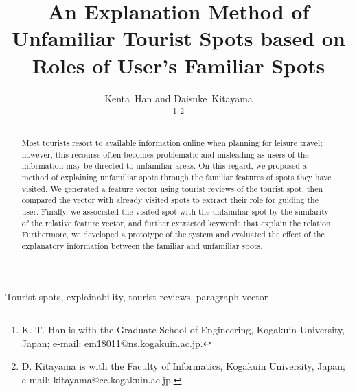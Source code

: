 \documentclass[journal]{IAENGtran}
\begin{document}
\title{An Explanation Method of Unfamiliar Tourist Spots based on Roles of User's Familiar Spots}
\author{Kenta~Han and Daisuke~Kitayama

\thanks{K. T. Han is with the Graduate School of Engineering, Kogakuin University, Japan; e-mail: em18011@ns.kogakuin.ac.jp.}%
\thanks{D. Kitayama is with the Faculty of Informatics, Kogakuin University, Japan;  e-mail: kitayama@cc.kogakuin.ac.jp.}}%

\maketitle

\pagestyle{empty}
\thispagestyle{empty}

\begin{abstract}
Most tourists resort to available information online when planning for leisure travel; however, this recourse often becomes problematic and misleading as users of the information may be directed to unfamiliar areas. On this regard, we proposed a method of explaining unfamiliar spots through the familiar features of spots they have visited. We generated a feature vector using  tourist reviews of the tourist spot, then compared the vector with already visited spots to extract their role for guiding the user. Finally, we associated the visited spot with the unfamiliar spot by the similarity of the relative feature vector, and further extracted keywords that explain the relation. Furthermore, we developed a prototype of the system and evaluated the effect of the explanatory information between the familiar and unfamiliar spots.
\end{abstract}

\begin{IAENGkeywords}
Tourist spots, explainability, tourist reviews, paragraph vector
\end{IAENGkeywords}

\IAENGpeerreviewmaketitle
\end{document}
